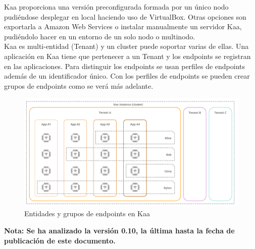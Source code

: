 \documentclass[12pt, twoside]{book}
\begin{document}
Kaa proporciona una versión preconfigurada formada por un único nodo pudiéndose desplegar en local haciendo uso de VirtualBox. Otras opciones son exportarla a Amazon Web Services o instalar manualmente un servidor Kaa, pudiéndolo hacer en un entorno de un solo nodo o multinodo.\\

Kaa es multi-entidad (Tenant) y un cluster puede soportar varias de ellas. Una aplicación en Kaa tiene que pertenecer a un Tenant y los endpoints se registran en las aplicaciones. Para distinguir los endpoints se usan perfiles de endpoints además de un identificador único. Con los perfiles de endpoints se pueden crear grupos de endpoints como se verá más adelante.
\begin{figure}[H]
\centering
\includegraphics[scale=0.3]{images/tenants}
\caption{Entidades y grupos de endpoints en Kaa}\label{tenant:kaa}
\end{figure}


\textbf{Nota: Se ha analizado la versión 0.10, la última hasta la fecha de publicación de este documento.}
\end{document}
